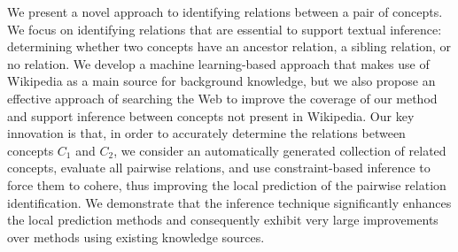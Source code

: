 We present a novel approach to identifying relations between a pair of
concepts. We focus on identifying relations that are essential to
support textual inference: determining whether two concepts have an
ancestor relation, a sibling relation, or no relation. We develop a
machine learning-based approach that makes use of Wikipedia as a main
source for background knowledge, but we also propose an effective
approach of searching the Web to improve the coverage of our method
and support inference between concepts not present in Wikipedia. Our
key innovation is that, in order to accurately determine the relations
between concepts $C_1$ and $C_2$, we consider an automatically
generated collection of related concepts, evaluate all pairwise
relations, and use constraint-based inference to force them to cohere,
thus improving the local prediction of the pairwise relation
identification. We demonstrate that the inference technique
significantly enhances the local prediction methods and consequently
exhibit very large improvements over methods using existing knowledge
sources.

